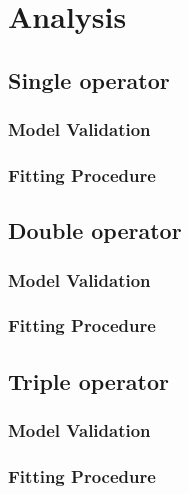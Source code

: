 \documentclass[a4paper]{article}
\begin{document}
\section{Analysis}


\subsection{Single operator}
\subsubsection{Model Validation}
\subsubsection{Fitting Procedure}

\subsection{Double operator}
\subsubsection{Model Validation}
\subsubsection{Fitting Procedure}

\subsection{Triple operator}
\subsubsection{Model Validation}
\subsubsection{Fitting Procedure}



\newpage
\begingroup
\raggedright{}
\sloppy
\printbibliography{}
\endgroup
\end{document}
